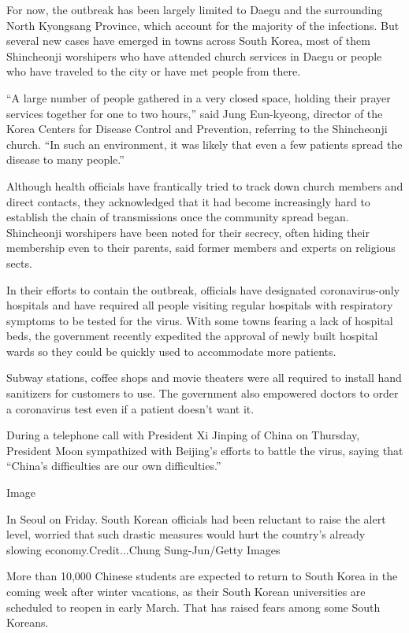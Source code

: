 For now, the outbreak has been largely limited to Daegu and the
surrounding North Kyongsang Province, which account for the majority of
the infections. But several new cases have emerged in towns across South
Korea, most of them Shincheonji worshipers who have attended church
services in Daegu or people who have traveled to the city or have met
people from there.

``A large number of people gathered in a very closed space, holding
their prayer services together for one to two hours,'' said Jung
Eun-kyeong, director of the Korea Centers for Disease Control and
Prevention, referring to the Shincheonji church. ``In such an
environment, it was likely that even a few patients spread the disease
to many people.''

Although health officials have frantically tried to track down church
members and direct contacts, they acknowledged that it had become
increasingly hard to establish the chain of transmissions once the
community spread began. Shincheonji worshipers have been noted for their
secrecy, often hiding their membership even to their parents, said
former members and experts on religious sects.

In their efforts to contain the outbreak, officials have designated
coronavirus-only hospitals and have required all people visiting regular
hospitals with respiratory symptoms to be tested for the virus. With
some towns fearing a lack of hospital beds, the government recently
expedited the approval of newly built hospital wards so they could be
quickly used to accommodate more patients.

Subway stations, coffee shops and movie theaters were all required to
install hand sanitizers for customers to use. The government also
empowered doctors to order a coronavirus test even if a patient doesn't
want it.

During a telephone call with President Xi Jinping of China on Thursday,
President Moon sympathized with Beijing's efforts to battle the virus,
saying that ``China's difficulties are our own difficulties.''

Image

In Seoul on Friday. South Korean officials had been reluctant to raise
the alert level, worried that such drastic measures would hurt the
country's already slowing economy.Credit...Chung Sung-Jun/Getty Images

More than 10,000 Chinese students are expected to return to South Korea
in the coming week after winter vacations, as their South Korean
universities are scheduled to reopen in early March. That has raised
fears among some South Koreans.

